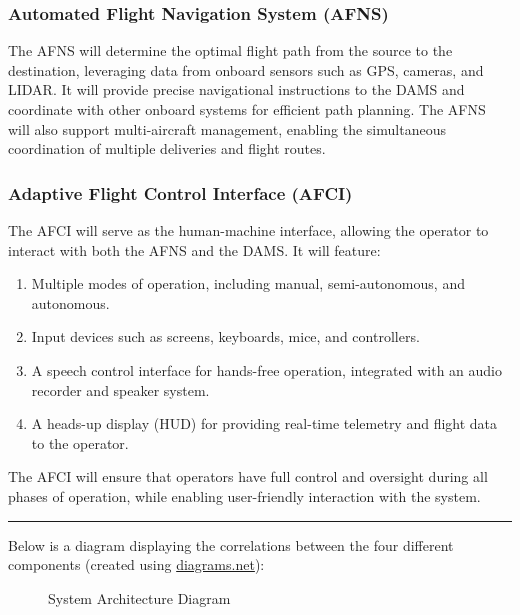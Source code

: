\documentclass[12pt]{article}
\begin{document}
\subsubsection{Automated Flight Navigation System (AFNS)}
The AFNS will determine the optimal flight path from the source to the destination, leveraging data from onboard sensors such as GPS, cameras, and LIDAR. It will provide precise navigational instructions to the DAMS and coordinate with other onboard systems for efficient path planning. The AFNS will also support multi-aircraft management, enabling the simultaneous coordination of multiple deliveries and flight routes.

\subsubsection{Adaptive Flight Control Interface (AFCI)}
The AFCI will serve as the human-machine interface, allowing the operator to interact with both the AFNS and the DAMS. It will feature:
\begin{enumerate}
    \item Multiple modes of operation, including manual, semi-autonomous, and autonomous.
    \item Input devices such as screens, keyboards, mice, and controllers.
    \item A speech control interface for hands-free operation, integrated with an audio recorder and speaker system.
    \item A heads-up display (HUD) for providing real-time telemetry and flight data to the operator.
\end{enumerate}
The AFCI will ensure that operators have full control and oversight during all phases of operation, while enabling user-friendly interaction with the system.

\noindent\rule{\textwidth}{0.4pt}

Below is a diagram displaying the correlations between the four different components (created using \href{https://www.diagrams.net/}{diagrams.net}):

\begin{figure}[H]
\centering
{}
\caption{System Architecture Diagram}
\end{figure}
\end{document}
